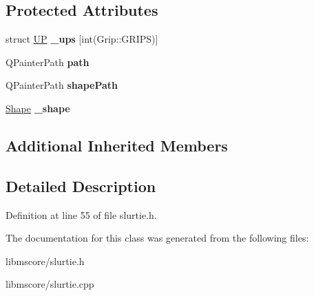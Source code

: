 \subsection*{Protected Attributes}
\begin{DoxyCompactItemize}
\item 
\mbox{\label{class_ms_1_1_slur_tie_segment_ac95644e17a1e593ef086a5c60493f444}} 
struct \hyperlink{struct_ms_1_1_u_p}{UP} {\bfseries \+\_\+ups} \mbox{[}int(Grip\+::\+G\+R\+I\+PS)\mbox{]}
\item 
\mbox{\label{class_ms_1_1_slur_tie_segment_acfa06a326ab9d2ab3d0e679cbcf6ffbe}} 
Q\+Painter\+Path {\bfseries path}
\item 
\mbox{\label{class_ms_1_1_slur_tie_segment_aa32d02705cfc08f62a1fde86cae5002a}} 
Q\+Painter\+Path {\bfseries shape\+Path}
\item 
\mbox{\label{class_ms_1_1_slur_tie_segment_ab0f739e1aa52786dc0ee5bf27090eb76}} 
\hyperlink{class_ms_1_1_shape}{Shape} {\bfseries \+\_\+shape}
\end{DoxyCompactItemize}
\subsection*{Additional Inherited Members}


\subsection{Detailed Description}


Definition at line 55 of file slurtie.\+h.



The documentation for this class was generated from the following files\+:\begin{DoxyCompactItemize}
\item 
libmscore/slurtie.\+h\item 
libmscore/slurtie.\+cpp\end{DoxyCompactItemize}
